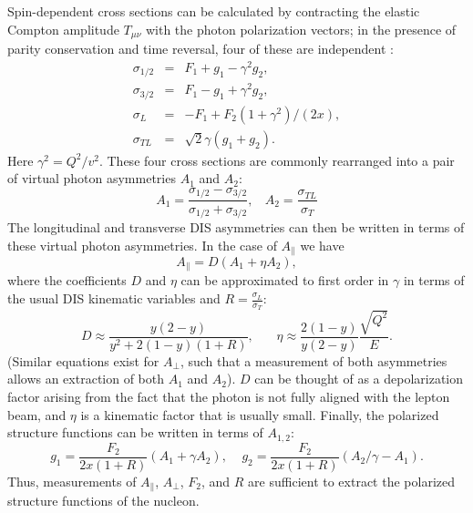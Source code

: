 Spin-dependent cross sections can be calculated by contracting the elastic
Compton amplitude $T_{\mu \nu}$ with the photon polarization vectors; in the
presence of parity conservation and time reversal, four of these are
independent \cite{}:
%
\begin{eqnarray}
  \sigma_{1/2} & = & F_1 + g_1 - \gamma^2 g_2, \nonumber \\
  \sigma_{3/2} & = & F_1 - g_1 + \gamma^2 g_2, \nonumber \\
  \sigma_L & = & -F_1 + F_2(1+\gamma^2)/(2x),  \nonumber \\
  \sigma_{TL} & = & \sqrt{2}\gamma (g_1+g_2).
\end{eqnarray}
%
Here $\gamma^2 = Q^2/v^2$. These four cross sections are commonly rearranged
into a pair of virtual photon asymmetries $A_1$ and $A_2$:
%
\begin{equation}
  A_1 = \frac{\sigma_{1/2} - \sigma_{3/2}}{\sigma_{1/2} + \sigma_{3/2}}, ~~~~ A_2 = \frac{\sigma_{TL}}{\sigma_T}
\end{equation}
%
The longitudinal and transverse DIS asymmetries can then be written in terms
of these virtual photon asymmetries. In the case of $A_{\parallel}$ we have
\begin{equation}
  A_{\parallel} = D(A_1 + \eta A_2),
\end{equation}
%
where the coefficients $D$ and $\eta$ can be approximated to first order in
$\gamma$ in terms of the usual DIS kinematic variables and $R =
\frac{\sigma_{L}}{\sigma_T}$:
\begin{equation}
  D \approx \frac{y(2-y)}{y^2 + 2(1-y)(1+R)}, ~~~~~~~~ \eta \approx \frac{2(1-y)}{y(2-y)} \frac{\sqrt{Q^2}}{E}.
\end{equation}
%
(Similar equations exist for $A_{\perp}$, such that a measurement of both
asymmetries allows an extraction of both $A_1$ and $A_2$). $D$ can be thought
of as a depolarization factor arising from the fact that the photon is not
fully aligned with the lepton beam, and $\eta$ is a kinematic factor that is
usually small. Finally, the polarized structure functions can be written in
terms of $A_{1,2}$:
\begin{equation}
  g_1 = \frac{F_2}{2x(1+R)}(A_1+\gamma A_2), ~~~~~ g_2 = \frac{F_2}{2x(1+R)}(A_2/\gamma - A_1).
\end{equation}
Thus, measurements of $A_{\parallel}$, $A_{\perp}$, $F_2$, and $R$ are
sufficient to extract the polarized structure functions of the nucleon.

